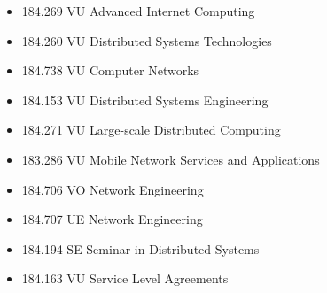 \documentclass[a4paper]{article}
\begin{document}
\begin{itemize}

\item{184.269 VU Advanced Internet Computing}
\item{184.260 VU Distributed Systems Technologies}
\item{184.738 VU Computer Networks}
\item{184.153 VU Distributed Systems Engineering}
\item{184.271 VU Large-scale Distributed Computing}
\item{183.286 VU Mobile Network Services and Applications}
\item{184.706 VO Network Engineering}
\item{184.707 UE Network Engineering}
\item{184.194 SE Seminar in Distributed Systems}
\item{184.163 VU Service Level Agreements }

\end{itemize}

\printbibliography
\end{document}
